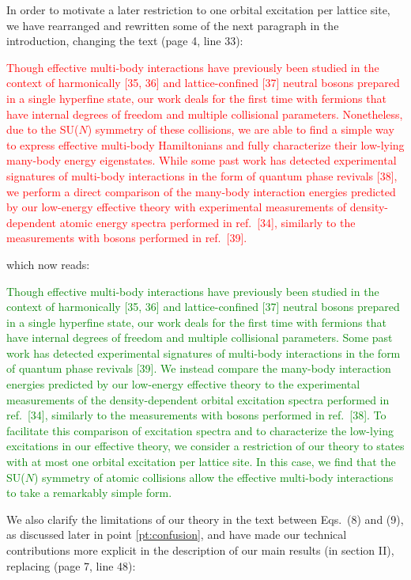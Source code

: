 \documentclass[preprint]{revtex4-1}
\newcommand{\1}{\mathds{1}}
\newcommand{\red}[1]{\textcolor{red}{#1}}
\newcommand{\green}[1]{\textcolor{green}{#1}}
\begin{document}
\begin{enumerate}
  In order to motivate a later restriction to one orbital excitation
  per lattice site, we have rearranged and rewritten some of the next
  paragraph in the introduction, changing the text (page 4, line 33):

  \red{Though effective multi-body interactions have previously been
    studied in the context of harmonically [35, 36] and
    lattice-confined [37] neutral bosons prepared in a single
    hyperfine state, our work deals for the first time with fermions
    that have internal degrees of freedom and multiple collisional
    parameters.  Nonetheless, due to the SU($N$) symmetry of these
    collisions, we are able to find a simple way to express effective
    multi-body Hamiltonians and fully characterize their low-lying
    many-body energy eigenstates.  While some past work has detected
    experimental signatures of multi-body interactions in the form of
    quantum phase revivals [38], we perform a direct comparison of the
    many-body interaction energies predicted by our low-energy
    effective theory with experimental measurements of
    density-dependent atomic energy spectra performed in ref.~[34],
    similarly to the measurements with bosons performed in ref.~[39].}

  which now reads:

  \green{Though effective multi-body interactions have previously been
    studied in the context of harmonically [35, 36] and
    lattice-confined [37] neutral bosons prepared in a single
    hyperfine state, our work deals for the first time with fermions
    that have internal degrees of freedom and multiple collisional
    parameters.  Some past work has detected experimental signatures
    of multi-body interactions in the form of quantum phase revivals
    [39].  We instead compare the many-body interaction energies
    predicted by our low-energy effective theory to the experimental
    measurements of the density-dependent orbital excitation spectra
    performed in ref.~[34], similarly to the measurements with bosons
    performed in ref.~[38].  To facilitate this comparison of
    excitation spectra and to characterize the low-lying excitations
    in our effective theory, we consider a restriction of our theory
    to states with at most one orbital excitation per lattice site.
    In this case, we find that the SU($N$) symmetry of atomic
    collisions allow the effective multi-body interactions to take a
    remarkably simple form.}

  We also clarify the limitations of our theory in the text between
  Eqs.~(8) and (9), as discussed later in point \ref{pt:confusion},
  and have made our technical contributions more explicit in the
  description of our main results (in section II), replacing (page 7,
  line 48):


\end{enumerate}
\end{document}
